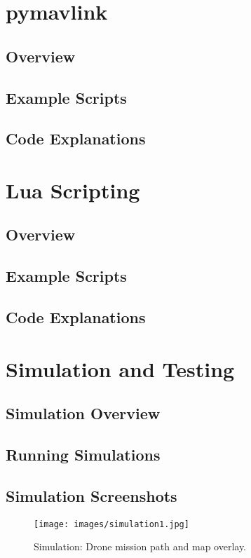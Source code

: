 \documentclass[12pt,a4paper]{report}
\begin{document}
\chapter{pymavlink}
\section{Overview}
\section{Example Scripts}
\section{Code Explanations}

\chapter{Lua Scripting}
\section{Overview}
\section{Example Scripts}
\section{Code Explanations}

\chapter{Simulation and Testing}
\section{Simulation Overview}
\section{Running Simulations}
\section{Simulation Screenshots}
\begin{figure}[h!]
    \centering
    \texttt{[image: images/simulation1.jpg]}
    \caption{Simulation: Drone mission path and map overlay.}
    \label{fig:sim1}
\end{figure}
\end{document}
